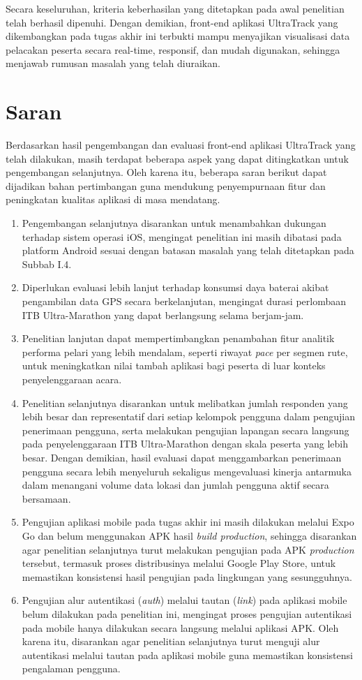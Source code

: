 Secara keseluruhan, kriteria keberhasilan yang ditetapkan pada awal penelitian telah berhasil dipenuhi. Dengan demikian, front-end aplikasi UltraTrack yang dikembangkan pada tugas akhir ini terbukti mampu menyajikan visualisasi data pelacakan peserta secara real-time, responsif, dan mudah digunakan, sehingga menjawab rumusan masalah yang telah diuraikan.

\section{Saran}
Berdasarkan hasil pengembangan dan evaluasi front-end aplikasi UltraTrack yang telah dilakukan, masih terdapat beberapa aspek yang dapat ditingkatkan untuk pengembangan selanjutnya. Oleh karena itu, beberapa saran berikut dapat dijadikan bahan pertimbangan guna mendukung penyempurnaan fitur dan peningkatan kualitas aplikasi di masa mendatang.

\begin{enumerate}
    \item Pengembangan selanjutnya disarankan untuk menambahkan dukungan terhadap sistem operasi iOS, mengingat penelitian ini masih dibatasi pada platform Android sesuai dengan batasan masalah yang telah ditetapkan pada Subbab I.4.
    \item Diperlukan evaluasi lebih lanjut terhadap konsumsi daya baterai akibat pengambilan data GPS secara berkelanjutan, mengingat durasi perlombaan ITB Ultra-Marathon yang dapat berlangsung selama berjam-jam.
    \item Penelitian lanjutan dapat mempertimbangkan penambahan fitur analitik performa pelari yang lebih mendalam, seperti riwayat \textit{pace} per segmen rute, untuk meningkatkan nilai tambah aplikasi bagi peserta di luar konteks penyelenggaraan acara.
    \item Penelitian selanjutnya disarankan untuk melibatkan jumlah responden yang lebih besar dan representatif dari setiap kelompok pengguna dalam pengujian penerimaan pengguna, serta melakukan pengujian lapangan secara langsung pada penyelenggaraan ITB Ultra-Marathon dengan skala peserta yang lebih besar. Dengan demikian, hasil evaluasi dapat menggambarkan penerimaan pengguna secara lebih menyeluruh sekaligus mengevaluasi kinerja antarmuka dalam menangani volume data lokasi dan jumlah pengguna aktif secara bersamaan.
    \item Pengujian aplikasi mobile pada tugas akhir ini masih dilakukan melalui Expo Go dan belum menggunakan APK hasil \textit{build production}, sehingga disarankan agar penelitian selanjutnya turut melakukan pengujian pada APK \textit{production} tersebut, termasuk proses distribusinya melalui Google Play Store, untuk memastikan konsistensi hasil pengujian pada lingkungan yang sesungguhnya.
    \item Pengujian alur autentikasi (\textit{auth}) melalui tautan (\textit{link}) pada aplikasi mobile belum dilakukan pada penelitian ini, mengingat proses pengujian autentikasi pada mobile hanya dilakukan secara langsung melalui aplikasi APK. Oleh karena itu, disarankan agar penelitian selanjutnya turut menguji alur autentikasi melalui tautan pada aplikasi mobile guna memastikan konsistensi pengalaman pengguna.
\end{enumerate}